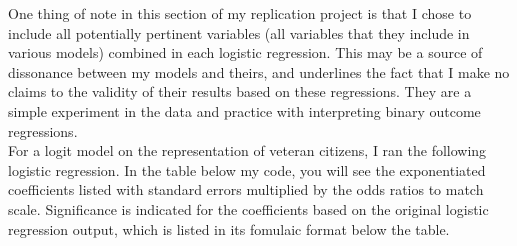 \documentclass[12pt,letterpaper]{article}
\begin{document}
	One thing of note in this section of my replication project is that I chose to include all potentially pertinent variables (all variables that they include in various models) combined in each logistic regression. This may be a source of dissonance between my models and theirs, and underlines the fact that I make no claims to the validity of their results based on these regressions. They are a simple experiment in the data and practice with interpreting binary outcome regressions. \\
	
	 For a logit model on the representation of veteran citizens, I ran the following logistic regression. In the table below my code, you will see the exponentiated coefficients listed with standard errors multiplied by the odds ratios to match scale. Significance is indicated for the coefficients based on the original logistic regression output, which is listed in its fomulaic format below the table.\\
	
\end{document}
